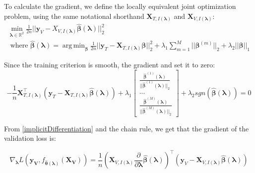 \documentclass[10pt,letterpaper]{article}
\DeclareMathOperator*{\argmin}{arg\,min}
\begin{document}
To calculate the gradient, we define the locally equivalent joint optimization problem, using the same notational shorthand $\boldsymbol{X}_{T, I(\boldsymbol\lambda)}$ and $\boldsymbol{X}_{V, I(\boldsymbol\lambda)}$:
\begin{equation}
\begin{array}{c}
\min_{\boldsymbol{\lambda} \in \mathbb{R}^2} \frac{1}{2n} \bigl\lvert\bigl\lvert \boldsymbol{y}_V - X_{V,I(\boldsymbol\lambda)} \hat{\boldsymbol\beta}(\boldsymbol{\lambda}) \bigl\rvert\bigl\rvert^2_2 \\
\text{ where }
\hat{\boldsymbol{\beta}}(\boldsymbol{\lambda}) = \argmin_{\boldsymbol \beta}
\frac{1}{2n} \bigl\lvert\bigl\lvert \boldsymbol{y}_T - \boldsymbol{X}_{T, I(\boldsymbol\lambda)} \boldsymbol \beta \bigl\rvert\bigl\rvert^2_2
+ \lambda_1 \sum_{m=1}^M \lvert\lvert \boldsymbol \beta^{(m)} \rvert \rvert_2
+ \lambda_2 \lvert\lvert \boldsymbol \beta \rvert \rvert_1
\end{array}
\end{equation}

Since the training criterion is smooth, the gradient and set it to zero:
\begin{equation}
-\frac{1}{n} \boldsymbol{X}_{T, I(\boldsymbol\lambda)}^\top(\boldsymbol{y}_T - \boldsymbol{X}_{T, I(\boldsymbol\lambda)} \hat{\boldsymbol\beta}(\boldsymbol \lambda))
+ \lambda_1
\begin{bmatrix}
\frac{\hat{\boldsymbol{\beta}}^{(1)} (\boldsymbol \lambda)}{||\hat{\boldsymbol{\beta}}^{(1)} (\boldsymbol \lambda)||_2}\\
...\\
\frac{\hat{\boldsymbol\beta}^{(M)}(\boldsymbol \lambda)}{||\hat{\boldsymbol{\beta}}^{(M)} (\boldsymbol \lambda)||_2}
\end{bmatrix}
+ \lambda_2 sgn(\hat{\boldsymbol\beta}(\boldsymbol \lambda)) =0
\end{equation}

From \eqref{implicitDifferentiation} and the chain rule, we get that the gradient of the validation loss is:

\begin{equation}
\nabla_{\boldsymbol \lambda} L(\boldsymbol{y_V}, f_{\hat{\boldsymbol{\theta}}(\boldsymbol{\lambda})}(\boldsymbol{X_V})) =
\frac{1}{n}
\left (
\boldsymbol{X}_{V, I(\boldsymbol\lambda)}
\frac{\partial}{\partial \boldsymbol\lambda} \hat{\boldsymbol{\beta}}(\boldsymbol{\lambda})
\right )^\top
\left (
\boldsymbol{y}_V - \boldsymbol{X}_{V, I(\boldsymbol\lambda)} \hat{\boldsymbol{\beta}}(\boldsymbol{\lambda})
\right )
\end{equation}
\end{document}
